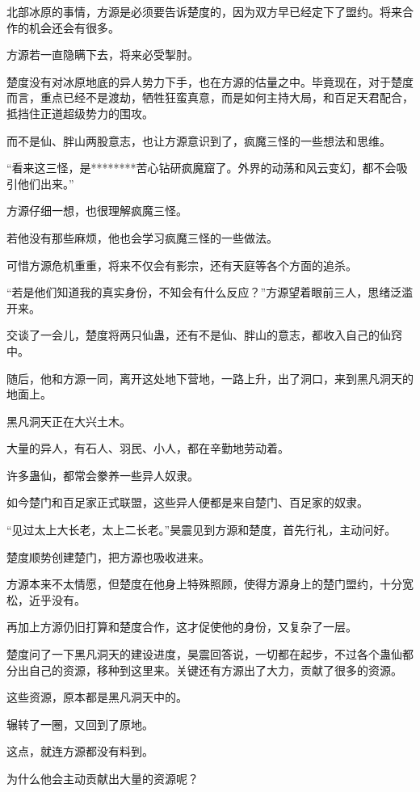 \begin{this_body}
北部冰原的事情，方源是必须要告诉楚度的，因为双方早已经定下了盟约。将来合作的机会还会有很多。

方源若一直隐瞒下去，将来必受掣肘。

楚度没有对冰原地底的异人势力下手，也在方源的估量之中。毕竟现在，对于楚度而言，重点已经不是渡劫，牺牲狂蛮真意，而是如何主持大局，和百足天君配合，抵挡住正道超级势力的围攻。

而不是仙、胖山两股意志，也让方源意识到了，疯魔三怪的一些想法和思维。

“看来这三怪，是********苦心钻研疯魔窟了。外界的动荡和风云变幻，都不会吸引他们出来。”

方源仔细一想，也很理解疯魔三怪。

若他没有那些麻烦，他也会学习疯魔三怪的一些做法。

可惜方源危机重重，将来不仅会有影宗，还有天庭等各个方面的追杀。

“若是他们知道我的真实身份，不知会有什么反应？”方源望着眼前三人，思绪泛滥开来。

交谈了一会儿，楚度将两只仙蛊，还有不是仙、胖山的意志，都收入自己的仙窍中。

随后，他和方源一同，离开这处地下营地，一路上升，出了洞口，来到黑凡洞天的地面上。

黑凡洞天正在大兴土木。

大量的异人，有石人、羽民、小人，都在辛勤地劳动着。

许多蛊仙，都常会豢养一些异人奴隶。

如今楚门和百足家正式联盟，这些异人便都是来自楚门、百足家的奴隶。

“见过太上大长老，太上二长老。”昊震见到方源和楚度，首先行礼，主动问好。

楚度顺势创建楚门，把方源也吸收进来。

方源本来不太情愿，但楚度在他身上特殊照顾，使得方源身上的楚门盟约，十分宽松，近乎没有。

再加上方源仍旧打算和楚度合作，这才促使他的身份，又复杂了一层。

楚度问了一下黑凡洞天的建设进度，昊震回答说，一切都在起步，不过各个蛊仙都分出自己的资源，移种到这里来。关键还有方源出了大力，贡献了很多的资源。

这些资源，原本都是黑凡洞天中的。

辗转了一圈，又回到了原地。

这点，就连方源都没有料到。

为什么他会主动贡献出大量的资源呢？


\end{this_body}
